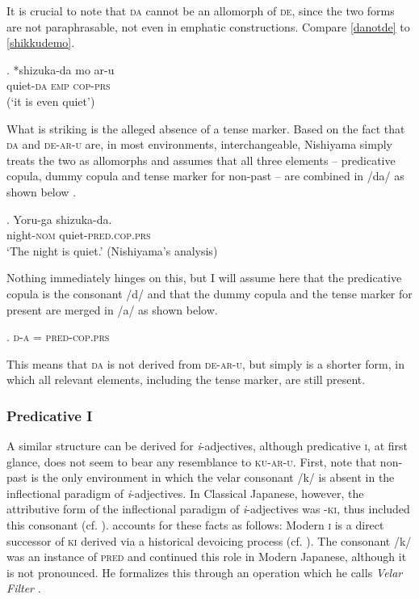 It is crucial to note that \textsc{da} cannot be an allomorph of \textsc{de}, since the two forms are not paraphrasable, not even in emphatic constructions. Compare \ref{danotde} to \ref{shikkudemo}.

\exg. *shizuka-da mo ar-u\\
quiet-\textsc{da} \textsc{emp} \textsc{cop-prs}\\
(`it is even quiet’) \null \hfill \citep[186]{nishiyama:1999:adj} \label{danotde}
\clearpage

What is striking is the alleged absence of a tense marker. Based on the fact that \textsc{da} and \textsc{de-ar-u} are, in most environments, interchangeable, Nishiyama simply treats the two as allomorphs and assumes that all three elements -- predicative copula, dummy copula and tense marker for non-past -- are combined in /da/ as shown below \citep[196–197]{nishiyama:1999:adj}.

\exg. Yoru-ga shizuka-da.\\
night-\textsc{nom} quiet-\textsc{pred.cop.prs}\\
`The night is quiet.' \null \hfill (Nishiyama's analysis)

Nothing immediately hinges on this, but I will assume here that the predicative copula is the consonant /d/ and that the dummy copula and the tense marker for present are merged in /a/ as shown below.

\ex. \textsc{d-a} = \textsc{pred-cop.prs}

This means that \textsc{da} is not derived from \textsc{de-ar-u}, but simply is a shorter form, in which all relevant elements, including the tense marker, are still present.

\subsubsection{Predicative I} \label{predicativei}

A similar structure can be derived for \textit{i}-adjectives, although predicative \textsc{i}, at first glance, does not seem to bear any resemblance to \textsc{ku-ar-u}. First, note that non-past is the only environment in which the velar consonant /k/ is absent in the inflectional paradigm of \textit{i}-adjectives. In  Classical Japanese, however, the attributive form of the inflectional paradigm of \textit{i}-adjectives was -\textsc{ki}, thus included this consonant (cf. \citealt[189–190]{nishiyama:1999:adj}). \citet{nishiyama:1999:adj} accounts for these facts as follows: Modern \textsc{i} is a direct successor of \textsc{ki} derived via a historical devoicing process (cf. \citealt{frellesvig:2010:history}). The consonant /k/ was an instance of \textsc{pred} and continued this role in Modern Japanese, although it is not pronounced. He formalizes this through an operation which he calls \textit{Velar Filter} \citep[191]{nishiyama:1999:adj}.

